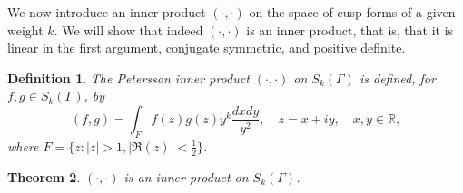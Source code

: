 \documentclass{article}
\newtheorem{theorem}{Theorem}
\newtheorem{definition}[theorem]{Definition}
\begin{document}
We now introduce an inner product $(\cdot,\cdot)$ on the space of cusp forms of a given weight $k$. We will show that indeed $(\cdot,\cdot)$ is an inner product, that is, that
it is linear in the first argument, conjugate symmetric, and positive definite. 

\begin{definition}
The {\em Petersson inner product} $(\cdot,\cdot)$ on $S_k(\Gamma)$ is defined, for $f,g \in S_k(\Gamma)$, by
\begin{equation}
\label{eqn:petersson}
(f,g) = \int_F f(z)\overline{g(z)}y^{k} \frac{dxdy}{y^2}, \quad z=x+iy, \quad x,y \in \mathbb{R},
\end{equation}
where $F=\{z:|z|>1, |\Re(z)|<\frac{1}{2}\}$.
\end{definition}

\begin{theorem}
$(\cdot,\cdot)$ is an inner product on $S_k(\Gamma)$.
\end{theorem}
\end{document}
